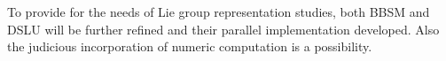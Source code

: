 \documentclass{acm_proc_article-sp}
\begin{document}
To provide for the needs of Lie group representation studies, both BBSM and DSLU will 
be further refined and their parallel implementation developed.  Also the judicious 
incorporation of numeric computation is a possibility.





\end{document}
